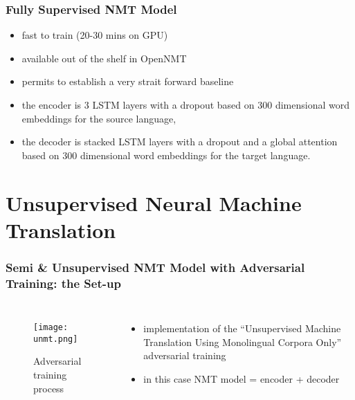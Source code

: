 \documentclass{beamer}
\begin{document}
\begin{frame}
\frametitle{Fully Supervised NMT Model}

\begin{itemize}
\item fast to train (20-30 mins on GPU)
\item available out of the shelf in OpenNMT
\item permits to establish a very strait forward baseline
\item<2-3> the encoder is $3$ LSTM layers with a dropout based on $300$ dimensional word embeddings for the source language,
\item<2-3> the decoder is stacked LSTM layers with a dropout and a global attention based on $300$ dimensional word embeddings for the target language.
\end{itemize}


\end{frame}

\section{Unsupervised Neural Machine Translation}

\begin{frame}
\frametitle{Semi \& Unsupervised NMT Model with Adversarial Training: the Set-up}

\begin{columns}
\centering
\begin{figure}
\texttt{[image: unmt.png]}
\caption{Adversarial training process}
\end{figure}
\begin{itemize}
\item implementation of the ``Unsupervised Machine Translation Using Monolingual Corpora Only'' adversarial training
\item in this case NMT model = encoder + decoder
\end{itemize}
\end{columns}

\end{frame}
\end{document}
